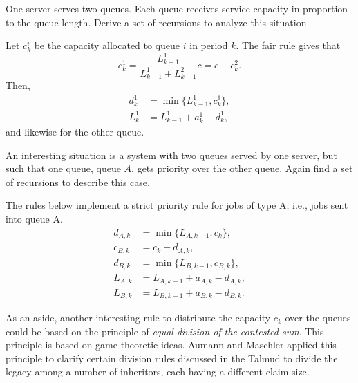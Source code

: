 \begin{extra} 
 One server serves two queues.
 Each queue receives service capacity in proportion to the queue length.
 Derive a set of recursions to analyze this situation.
\begin{solution}
 Let $c_k^i$ be the capacity allocated to queue $i$ in period $k$. The fair rule gives that 
 \begin{equation*}
 c_k^1 = \frac{L_{k-1}^1}{L_{k-1}^1 + L_{k-1}^2} c = c - c_k^2. 
 \end{equation*}
Then, 
\begin{equation*}
 \begin{split}
 d_k^1 &= \min\{L_{k-1}^1, c^1_k\}, \\
L_k^1 &= L_{k-1}^1+a_k^1 - d_k^1,
 \end{split}
\end{equation*}
and likewise for the other queue.
\end{solution}
\end{extra}

\begin{exercise}
 An interesting situation is a system with two queues served by one server, but such that one queue, queue $A$, gets priority over the other queue.
 Again find a set of recursions to describe this case.
\begin{solution}
 The rules below implement a strict priority rule for jobs of type
 A, i.e., jobs sent into queue A.
\begin{equation*}
 \begin{split}
 d_{A,k} &= \min\{L_{A,k-1}, c_k\}, \\
 c_{B,k} &= c_k - d_{A,k}, \\
 d_{B,k} &= \min\{L_{B,k-1}, c_{B,k}\}, \\
 L_{A,k} &= L_{A,k-1} + a_{A,k} - d_{A,k}, \\
 L_{B,k} &= L_{B,k-1} + a_{B,k} - d_{B,k}.
 \end{split}
\end{equation*}

As an aside, another interesting rule to distribute the capacity $c_k$ over the queues could be based on the principle of \textit{ equal division of the contested sum}.
This principle is based on game-theoretic ideas.
Aumann and Maschler applied this principle to clarify certain division rules discussed in the Talmud to divide the legacy among a number of inheritors, each having a different claim size.
\end{solution}
\end{exercise}



